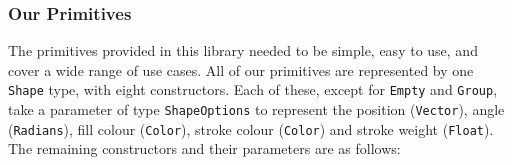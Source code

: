 \documentclass[../main.tex]{subfiles}
\begin{document}
            \subsubsection{Our Primitives}
                The primitives provided in this library needed to be simple, easy to use, and
                    cover a wide range of use cases.
                All of our primitives are represented by one \texttt{Shape} type, with eight
                    constructors.
                Each of these, except for \texttt{Empty} and \texttt{Group}, take a parameter
                    of type \texttt{ShapeOptions} to represent the position (\texttt{Vector}),
                    angle (\texttt{Radians}), fill colour (\texttt{Color}), stroke colour
                    (\texttt{Color}) and stroke weight (\texttt{Float}).
                The remaining constructors and their parameters are as follows:
\end{document}
